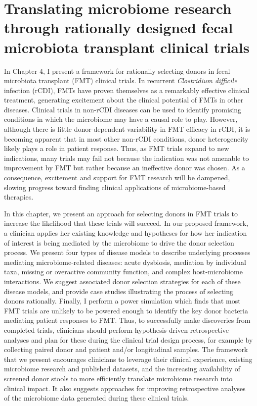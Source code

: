 \section{Translating microbiome research through rationally designed fecal microbiota transplant clinical trials}

In Chapter 4, I present a framework for rationally selecting donors in fecal microbiota transplant (FMT) clinical trials.
In recurrent \textit{Clostridium difficile} infection (rCDI), FMTs have proven themselves as a remarkably effective clinical treatment, generating excitement about the clinical potential of FMTs in other diseases.
Clinical trials in non-rCDI diseases can be used to identify promising conditions in which the microbiome may have a causal role to play.
However, although there is little donor-dependent variability in FMT efficacy in rCDI, it is becoming apparent that in most other non-rCDI conditions, donor heterogeneity likely plays a role in patient response.
Thus, as FMT trials expand to new indications, many trials may fail not because the indication was not amenable to improvement by FMT but rather because an ineffective donor was chosen.
As a consequence, excitement and support for FMT research will be dampened, slowing progress toward finding clinical applications of microbiome-based therapies.

In this chapter, we present an approach for selecting donors in FMT trials to increase the likelihood that these trials will succeed.
In our proposed framework, a clinician applies her existing knowledge and hypotheses for how her indication of interest is being mediated by the microbiome to drive the donor selection process.
We present four types of disease models to describe underlying processes mediating microbiome-related diseases: acute dysbiosis, mediation by individual taxa, missing or overactive community function, and complex host-microbiome interactions.
We suggest associated donor selection strategies for each of these disease models, and provide case studies illustrating the process of selecting donors rationally.
Finally, I perform a power simulation which finds that most FMT trials are unlikely to be powered enough to identify the key donor bacteria mediating patient responses to FMT.
Thus, to successfully make discoveries from completed trials, clinicians should perform hypothesis-driven retrospective analyses and plan for these during the clinical trial design process, for example by collecting paired donor and patient and/or longitudinal samples.
The framework that we present encourages clinicians to leverage their clinical experience, existing microbiome research and published datasets, and the increasing availability of screened donor stools to more efficiently translate microbiome research into clinical impact.
It also suggests approaches for improving retrospective analyses of the microbiome data generated during these clinical trials.


